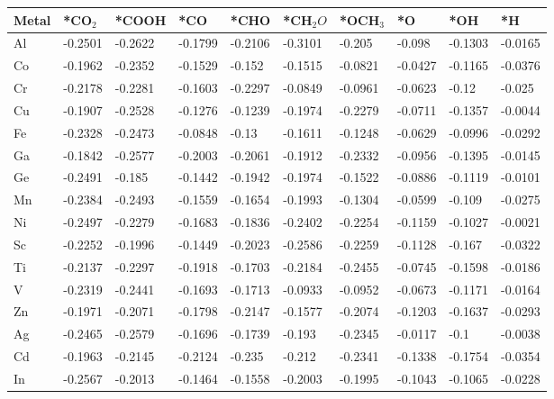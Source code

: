 \begin{table}[h]
  \centering
  {\fontsize{6}{12}\selectfont
  \begin{tabular}{*{10}{l}}
      \hline
      Metal & *CO$_2$ & *COOH& *CO     & *CHO    & *CH$_2O$& *OCH$_3$& *O      & *OH     & *H      \\
      \hline
      Al & -0.2501 & -0.2622 & -0.1799 & -0.2106 & -0.3101 & -0.205  & -0.098  & -0.1303 & -0.0165 \\
      Co & -0.1962 & -0.2352 & -0.1529 & -0.152  & -0.1515 & -0.0821 & -0.0427 & -0.1165 & -0.0376 \\
      Cr & -0.2178 & -0.2281 & -0.1603 & -0.2297 & -0.0849 & -0.0961 & -0.0623 & -0.12   & -0.025  \\
      Cu & -0.1907 & -0.2528 & -0.1276 & -0.1239 & -0.1974 & -0.2279 & -0.0711 & -0.1357 & -0.0044 \\
      Fe & -0.2328 & -0.2473 & -0.0848 & -0.13   & -0.1611 & -0.1248 & -0.0629 & -0.0996 & -0.0292 \\
      Ga & -0.1842 & -0.2577 & -0.2003 & -0.2061 & -0.1912 & -0.2332 & -0.0956 & -0.1395 & -0.0145 \\
      Ge & -0.2491 & -0.185  & -0.1442 & -0.1942 & -0.1974 & -0.1522 & -0.0886 & -0.1119 & -0.0101 \\
      Mn & -0.2384 & -0.2493 & -0.1559 & -0.1654 & -0.1993 & -0.1304 & -0.0599 & -0.109  & -0.0275 \\
      Ni & -0.2497 & -0.2279 & -0.1683 & -0.1836 & -0.2402 & -0.2254 & -0.1159 & -0.1027 & -0.0021 \\
      Sc & -0.2252 & -0.1996 & -0.1449 & -0.2023 & -0.2586 & -0.2259 & -0.1128 & -0.167  & -0.0322 \\
      Ti & -0.2137 & -0.2297 & -0.1918 & -0.1703 & -0.2184 & -0.2455 & -0.0745 & -0.1598 & -0.0186 \\
      V  & -0.2319 & -0.2441 & -0.1693 & -0.1713 & -0.0933 & -0.0952 & -0.0673 & -0.1171 & -0.0164 \\
      Zn & -0.1971 & -0.2071 & -0.1798 & -0.2147 & -0.1577 & -0.2074 & -0.1203 & -0.1637 & -0.0293 \\
      Ag & -0.2465 & -0.2579 & -0.1696 & -0.1739 & -0.193  & -0.2345 & -0.0117 & -0.1    & -0.0038 \\
      Cd & -0.1963 & -0.2145 & -0.2124 & -0.235  & -0.212  & -0.2341 & -0.1338 & -0.1754 & -0.0354 \\
      In & -0.2567 & -0.2013 & -0.1464 & -0.1558 & -0.2003 & -0.1995 & -0.1043 & -0.1065 & -0.0228 \\

\end{tabular}}
\end{table}
